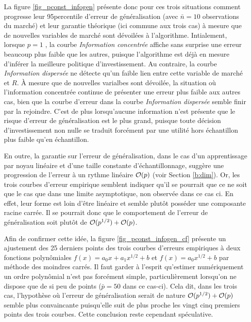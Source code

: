 La figure \ref{fig_pconst_infogen} présente donc pour ces trois situations comment
progresse leur 95\ieme percentile d'erreur de généralisation (avec $\bar n = 10$
observations du marché) et leur garantie théorique (ici commune aux trois cas) à mesure
que de nouvelles variables de marché sont dévoilées à l'algorithme. Intialement, lorsque
$p=1$ , la courbe \textit{Information concentrée} affiche sans surprise une erreur
beaucoup plus faible que les autres, puisque l'algorithme est déjà en mesure d'inférer la
meilleure politique d'investissement. Au contraire, la courbe \textit{Information
  dispersée} ne détecte qu'un faible lien entre cette variable de marché et $R$. À mesure
que de nouvelles varialbes sont dévoilée, la situation où l'information concentrée
continue de présenter une erreur plus faible aux autres cas, bien que la courbe d'erreur
dans la courbe \textit{Information dispersée} semble finir par la rejoindre. C'est de plus
lorsqu'aucune information n'est présente que le risque d'erreur de généralisation est le
plus grand, puisque toute décision d'investissement non nulle se traduit forcément par une
utilité hors échantillon plus faible qu'en échantillon.

En outre, la garantie sur l'erreur de généralisation, dans le cas d'un apprentissage par
noyau linéaire et d'une taille constante d'échantillonnage, suggère une progression de
l'erreur à un rythme linéaire $\mathcal O(p)$ (voir Section \ref{b:dim}). Or, les trois courbes
d'erreur empirique semblent indiquer qu'il se pourrait que ce ne soit que le cas que dans
une limite asymptotique, non observée dans ce cas ci. En effet, leur forme est loin d'être
linéaire et semble plutôt posséder une composante racine carrée. Il se pourrait donc que
le comportement de l'erreur de généralisation soit plutôt de $\mathcal O(p^{1/2}) + \mathcal O(p)$.

Afin de confirmer cette idée, la figure \ref{fig_pconst_infogen_cf} présente un ajustement
des 25 derniers points des trois courbes d'erreurs empiriques à deux fonctions
polynômiales $f(x) = a_0x + a_1x^{1/2} + b$ et $f(x) = a_0x^{1/2} + b$ par méthode des
moindres carrés. Il faut garder à l'esprit qu'estimer numériquement un ordre polynômial
n'est pas forcément simple, particulièrement lorsqu'on ne dispose que de si peu de points
($\bar p = 50$ dans ce cas-ci). Cela dit, dans les trois cas, l'hypothèse où l'erreur de
généralisation serait de nature $\mathcal O(p^{1/2}) + \mathcal O(p)$ semble plus convaincante
puisqu'elle suit de plus proche les vingt cinq premiers points des trois courbes. Cette
conclusion reste cependant spéculative.

